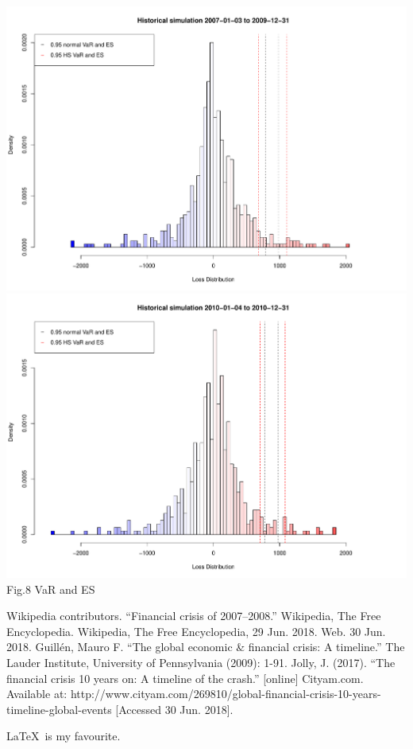 \documentclass[11pt]{article}
\begin{document}
\begin{center}
  \includegraphics[width=0.9\linewidth]{graph/HistoricalSimulation200709.pdf}
  \includegraphics[width=0.9\linewidth]{graph/HistoricalSimulation2010.pdf}\\
  Fig.8 VaR and ES
\end{center}

\newpage
\vspace{-0.8em}
\begin{thebibliography}{9}
 Wikipedia contributors. ``Financial crisis of 2007–2008.'' Wikipedia, The Free Encyclopedia. Wikipedia, The Free Encyclopedia, 29 Jun. 2018. Web. 30 Jun. 2018.
 Guillén, Mauro F. ``The global economic \& financial crisis: A timeline.'' The Lauder Institute, University of Pennsylvania (2009): 1-91.
 Jolly, J. (2017). ``The financial crisis 10 years on: A timeline of the crash.'' [online] Cityam.com. Available at: http://www.cityam.com/269810/global-financial-crisis-10-years-timeline-global-events [Accessed 30 Jun. 2018].
\end{thebibliography}
\LaTeX\ is my favourite.
\end{document}
